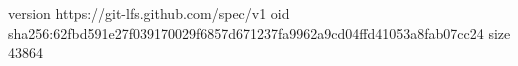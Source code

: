 version https://git-lfs.github.com/spec/v1
oid sha256:62fbd591e27f039170029f6857d671237fa9962a9cd04ffd41053a8fab07cc24
size 43864
